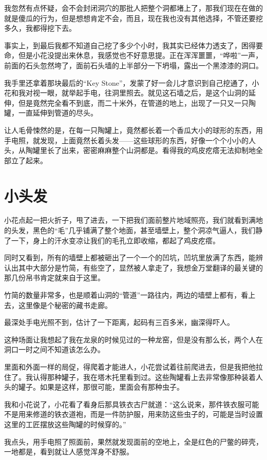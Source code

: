 我忽然有点怀疑，会不会封闭洞穴的那批人把整个洞都堵上了，那我们现在在做的就是傻瓜的行为，但是想想肯定不会，而且，现在我也没有其他选择，不管还要挖多久，我都得挖下去。

事实上，到最后我都不知道自己挖了多少个小时，我其实已经体力透支了，困得要命，但是小花没提出来休息，我感觉也不好意思提。正在浑浑噩噩，“哗啦”一声，前面的石头忽然垮了，面前石头墙的上半部分一下坍塌，露出一个黑漆漆的洞口。

我手里还拿着那块最后的“Key Stone”，发蒙了好一会儿才意识到自己挖通了，小花和我对视一眼，就举起手电，往洞里照去。就见这石墙之后，是这个山洞的延伸，但是竟然完全看不到底，而二十米外，在管道的地上，出现了一只又一只陶罐，一直延伸到管道的尽头。

让人毛骨悚然的是，在每一只陶罐上，竟然都长着一个香瓜大小的球形的东西，用手电照，就发现，上面竟然长着头发——这些球形的东西，好像一个个小小的人头，从陶罐里长了出来，密密麻麻整个山洞都是。看得我的鸡皮疙瘩无法抑制地全部立了起来。

\chapter{小头发}

小花点起一把火折子，甩了进去，一下把我们面前整片地域照亮，我们就看到满地的头发，黑色的“毛”几乎铺满了整个地面，甚至墙壁上，整个洞凉气逼人，我们静了一下，身上的汗水变凉让我们的毛孔立即收缩，都起了鸡皮疙瘩。

同时又看到，所有的墙壁上都被砸出了一个一个的凹坑，凹坑里放满了东西，能辨认出其中大部分是竹简，有些空了，显然被人拿走了，我想金万堂翻译的最关键的那几份帛书肯定就来自于这里。

竹简的数量非常多，也是顺着山洞的“管道”一路往内，两边的墙壁上都有，看上去，这里像是个秘密的藏书走廊。

最深处手电光照不到，估计了一下距离，起码有三百多米，幽深得吓人。

这种场面让我想起了我在龙泉的时候见过的一种龙窑，但是没有那么长，两个人在洞口一时之间不知道该怎么办。

里面和外面一样的局促，得爬着才能进人，小花尝试着往前爬进去，但是我把他拉住了。我认得那种罐子，我在塔木托里看到过。这些陶罐看上去非常像那种装着人头的罐子。如果是这样，那很可能，里面会有那种虫子。

我和小花说了，小花看了看身后那具铁衣古尸就道：“这么说来，那件铁衣服可能不是用来修道的铁衣道袍，而是一件防护服，用来防这些虫子的，可能是当时设置这里的工匠摆放这些陶罐的时候穿的。”

我点头，用手电照了照面前，果然就发现面前的空地上，全是红色的尸鳖的碎壳，一地都是，看到就让人感觉浑身不舒服。

